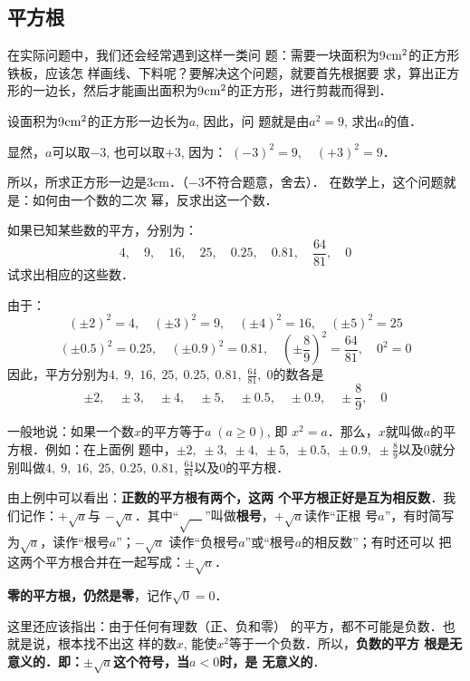 \subsection{平方根}
在实际问题中，我们还会经常遇到这样一类问
题：需要一块面积为9${\rm cm}^2$的正方形铁板，应该怎
样画线、下料呢？要解决这个问题，就要首先根据要
求，算出正方形的一边长，然后才能画出面积为9${\rm cm}^2$的正方形，进行剪裁而得到．

设面积为9${\rm cm}^2$的正方形一边长为$a$, 因此，问
题就是由$a^2=9$, 求出$a$的值．

显然，$a$可以取$-3$, 也可以取$+3$, 因为：
$(-3)^2=9,\quad (+3)^2=9$．

所以，所求正方形一边是3cm．（$-3$不符合题意，舍去）．
在数学上，这个问题就是：如何由一个数的二次
幂，反求出这一个数．

\begin{example}
    如果已知某些数的平方，分别为：
$$4,\quad 9,\quad 16,\quad 25,\quad 0.25,\quad 0.81,\quad \frac{64}{81},\quad 0$$
试求出相应的这些数．
\end{example}

\begin{solution}
由于：   
\[(\pm 2)^2=4,\quad  (\pm 3)^2=9,\quad (\pm 4)^2=16,\quad (\pm 5)^2=25\]
\[(\pm 0.5)^2=0.25,\quad (\pm 0.9)^2=0.81,\quad \left(\pm \frac{8}{9}\right)^2=\frac{64}{81},\quad 0^2=0 \]
因此，平方分别为$4,\; 9,\; 16,\; 25,\; 0.25,\; 0.81,\; \frac{64}{81},\; 0$的数各是
$$\pm 2,\quad \pm 3,\quad\pm 4,\quad\pm 5,\quad\pm 0.5,\quad\pm 0.9,\quad
\pm \frac{8}{9},\quad 0$$
\end{solution}

一般地说：如果一个数$x$的平方等于$a\; (a\ge 0)$, 即
$x^2=a$．那么，$x$就叫做$a$的平方根．例如：在上面例
题中，$\pm 2,\; \pm 3,\;\pm 4,\;\pm 5,\;\pm 0.5,\;\pm 0.9,\;
\pm \frac{8}{9}$以及0就分别叫做$4,\; 9,\; 16,\; 25,\; 0.25,\; 0.81,\; \frac{64}{81}$以及0的平方根．

由上例中可以看出：\textbf{正数的平方根有两个，这两
个平方根正好是互为相反数}．我们记作：$+\sqrt{a}$与
$-\sqrt{a}$．其中“$\sqrt{\quad}$”叫做\textbf{根号}，$+\sqrt{a}$读作“正根
号$a$”，有时简写为$\sqrt{a}$，读作“根号$a$”；$-\sqrt{a}$
读作“负根号$a$”或“根号$a$的相反数”；有时还可以
把这两个平方根合并在一起写成：$\pm \sqrt{a}$．

\textbf{零的平方根，仍然是零}，记作$\sqrt{0}=0$．

这里还应该指出：由于任何有理数（正、负和零）
的平方，都不可能是负数．也就是说，根本找不出这
样的数$x$, 能使$x^2$等于一个负数．所以，\textbf{负数的平方
根是无意义的．即：$\pm \sqrt{a}$这个符号，当$a<0$时，是
无意义的}．

